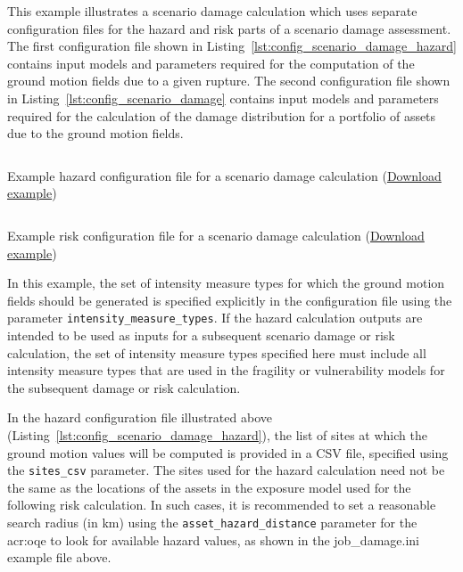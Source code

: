 This example illustrates a scenario damage calculation which uses separate
configuration files for the hazard and risk parts of a scenario damage
assessment. The first configuration file shown in
Listing~\ref{lst:config_scenario_damage_hazard} contains input models and
parameters required for the computation of the ground motion fields due to a
given rupture. The second configuration file shown in
Listing~\ref{lst:config_scenario_damage} contains input models and parameters
required for the calculation of the damage distribution for a portfolio of
assets due to the ground motion fields.

\begin{listing}[htbp]
  \inputminted[firstline=1,firstnumber=1,fontsize=\footnotesize,frame=single,linenos,bgcolor=lightgray,label=job\_hazard.ini]{ini}{oqum/risk/verbatim/config_scenario_hazard.ini}
  \caption{Example hazard configuration file for a scenario damage calculation (\href{https://raw.githubusercontent.com/gem/oq-engine/master/doc/manual/oqum/risk/verbatim/config_scenario_hazard.ini}{Download example})}
  \label{lst:config_scenario_damage_hazard}
\end{listing}

\begin{listing}[htbp]
  \inputminted[firstline=1,firstnumber=1,fontsize=\footnotesize,frame=single,linenos,bgcolor=lightgray,label=job\_damage.ini]{ini}{oqum/risk/verbatim/config_scenario_damage.ini}
  \caption{Example risk configuration file for a scenario damage calculation (\href{https://raw.githubusercontent.com/gem/oq-engine/master/doc/manual/oqum/risk/verbatim/config_scenario_damage.ini}{Download example})}
  \label{lst:config_scenario_damage}
\end{listing}


In this example, the set of intensity measure types for which the ground
motion fields should be generated is specified explicitly in the configuration
file using the parameter \Verb+intensity_measure_types+. If the hazard
calculation outputs are intended to be used as inputs for a subsequent
scenario damage or risk calculation, the set of intensity measure types
specified here must include all intensity measure types that are used in the
fragility or vulnerability models for the subsequent damage or risk
calculation.

In the hazard configuration file illustrated above
(Listing~\ref{lst:config_scenario_damage_hazard}), the list of sites at which
the ground motion values will be computed is provided in a CSV file, specified
using the \Verb+sites_csv+ parameter. The sites used for the hazard
calculation need not be the same as the locations of the assets in the
exposure model used for the following risk calculation. In such cases, it is
recommended to set a reasonable search radius (in km) using the
\Verb+asset_hazard_distance+ parameter for the \glsdesc{acr:oqe} to look for
available hazard values, as shown in the job\_damage.ini example file above.

